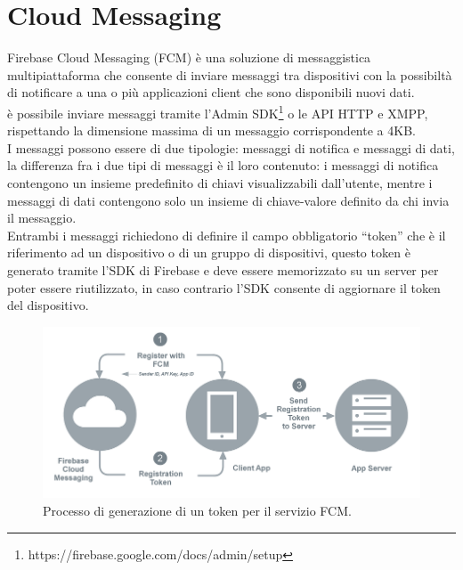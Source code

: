 \newpage
\section{Cloud Messaging}                 %
Firebase Cloud Messaging (FCM) è una soluzione di messaggistica multipiattaforma che consente di inviare messaggi tra dispositivi con la possibiltà di notificare a una o più applicazioni client che sono disponibili nuovi dati.\\
è possibile inviare messaggi tramite l'Admin SDK\footnote{https://firebase.google.com/docs/admin/setup} o le API HTTP e XMPP, rispettando la dimensione massima di un messaggio corrispondente a 4KB.\\
I messaggi possono essere di due tipologie: messaggi di notifica e messaggi di dati, la differenza fra i due tipi di messaggi è il loro contenuto: i messaggi di notifica contengono un insieme predefinito di chiavi visualizzabili dall'utente, mentre i messaggi di dati contengono solo un insieme di chiave-valore definito da chi invia il messaggio.\\
Entrambi i messaggi richiedono di definire il campo obbligatorio ``token'' che è il riferimento ad un dispositivo o di un gruppo di dispositivi, questo token è generato tramite l'SDK di Firebase e deve essere memorizzato su un server per poter essere riutilizzato, in caso contrario l'SDK consente di aggiornare il token del dispositivo.

\begin{figure}[!hb]
  \centering
  \includegraphics[width=1\textwidth]{immagini/fcm_token.png}
  \caption{Processo di generazione di un token per il servizio FCM.}
  \label{fig:Processo di generazione di un token per il servizio FCM}
\end{figure}


